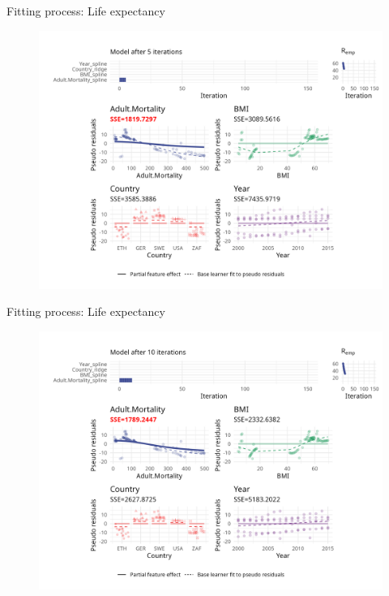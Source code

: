 \begin{frame}{Fitting process: Life expectancy}
	\begin{figure}
		\centering
		\includegraphics[width=\textwidth]{figures/cwb-anim/fig-iter-0005.png}
	\end{figure}
	\addtocounter{framenumber}{-1}
\end{frame}


\begin{frame}{Fitting process: Life expectancy}
	\begin{figure}
		\centering
		\includegraphics[width=\textwidth]{figures/cwb-anim/fig-iter-0010.png}
	\end{figure}
	\addtocounter{framenumber}{-1}
\end{frame}


